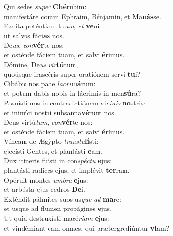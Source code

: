 \evenverse Qui sedes \textit{su}\textit{per} \textbf{Ché}rubim:~\*\\
\evenverse manifestáre coram Ephraim, Bénjamin, et Ma\textbf{nás}se.\\
\oddverse Excita poténtiam tu\textit{am}, \textit{et} \textbf{ve}ni:~\*\\
\oddverse ut salvos fáci\textbf{as} nos.\\
\evenverse De\textit{us}, \textit{con}\textbf{vér}te nos:~\*\\
\evenverse et osténde fáciem tuam, et salvi \textbf{é}rimus.\\
\oddverse Dómine, De\textit{us} \textit{vir}\textbf{tú}tum,~\*\\
\oddverse quoúsque irascéris super oratiónem servi \textbf{tu}i?\\
\evenverse Cibábis nos pane \textit{la}\textit{cri}\textbf{má}rum:~\*\\
\evenverse et potum dabis nobis in lácrimis in men\textbf{sú}ra?\\
\oddverse Posuísti nos in contradictiónem vi\textit{cí}\textit{nis} \textbf{no}stris:~\*\\
\oddverse et inimíci nostri subsanna\textbf{vé}runt nos.\\
\evenverse Deus virtú\textit{tum}, \textit{con}\textbf{vér}te nos:~\*\\
\evenverse et osténde fáciem tuam, et salvi \textbf{é}rimus.\\
\oddverse Víneam de Ægýpto \textit{tran}\textit{stu}\textbf{lí}sti:~\*\\
\oddverse ejecísti Gentes, et plantásti \textbf{e}am.\\
\evenverse Dux itíneris fuísti in con\textit{spé}\textit{ctu} \textbf{e}jus:~\*\\
\evenverse plantásti radíces ejus, et implévit \textbf{ter}ram.\\
\oddverse Opéruit montes \textit{um}\textit{bra} \textbf{e}jus:~\*\\
\oddverse et arbústa ejus cedros \textbf{De}i.\\
\evenverse Exténdit pálmites suos us\textit{que} \textit{ad} \textbf{ma}re:~\*\\
\evenverse et usque ad flumen propágines \textbf{e}jus.\\
\oddverse Ut quid destruxísti macé\textit{ri}\textit{am} \textbf{e}jus:~\*\\
\oddverse et vindémiant eam omnes, qui prætergrediúntur \textbf{vi}am?\\
